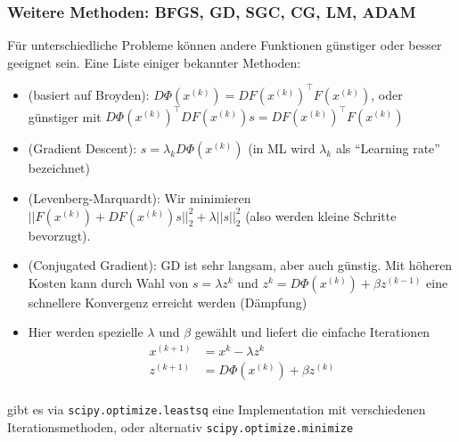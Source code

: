 \newpage
\subsubsection{Weitere Methoden: BFGS, GD, SGC, CG, LM, ADAM}
Für unterschiedliche Probleme können andere Funktionen günstiger oder besser geeignet sein.
Eine Liste einiger bekannter Methoden:
\begin{itemize}
    \item {} (basiert auf Broyden): $D\Phi(x^{(k)}) = DF(x^{(k)})^\top F(x^{(k)})$, oder günstiger mit $D\Phi(x^{(k)})^\top DF(x^{(k)})s = DF(x^{(k)})^\top F(x^{(k)})$
    \item {} (Gradient Descent): $s = \lambda_k D\Phi(x^{(k)})$ (in ML wird $\lambda_k$ als ``Learning rate'' bezeichnet)
    \item {} (Levenberg-Marquardt): Wir minimieren $||F(x^{(k)}) + DF(x^{(k)})s||_2^2 + \lambda ||s||^2_2$ (also werden kleine Schritte bevorzugt).
    \item {} (Conjugated Gradient): GD ist sehr langsam, aber auch günstig. Mit höheren Kosten kann durch Wahl von
          $s = \lambda z^k$ und $z^k = D\Phi(x^{(k)}) + \beta z^(k - 1)$ eine schnellere Konvergenz erreicht werden (Dämpfung)
    \item {} Hier werden spezielle $\lambda$ und $\beta$ gewählt und liefert die einfache Iterationen
          \rmvspace
          \begin{align*}
              x^{(k + 1)} & = x^k - \lambda z^k              \\
              z^{(k + 1)} & = D\Phi(x^{(k)}) + \beta z^{(k)} \\
          \end{align*}
\end{itemize}

\drmvspace\drmvspace
\innumpy gibt es via \texttt{scipy.optimize.leastsq} eine Implementation mit verschiedenen Iterationsmethoden, oder alternativ \texttt{scipy.optimize.minimize}
